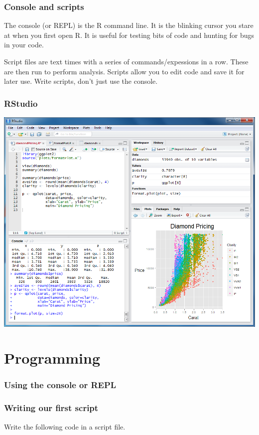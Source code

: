 \documentclass{beamer}\usepackage{graphicx, color}
\begin{document}
\begin{frame}
  \frametitle{Console and scripts}
  The console (or REPL) is the R command line. It is the blinking cursor you stare at when you first open R. It is useful for testing bits of code and hunting for bugs in your code.

  Script files are text times with a series of commands/expessions in a row. These are then run to perform analysis. Scripts allow you to edit code and save it for later use. Write scripts, don't just use the console.

\end{frame}

\begin{frame}
  \frametitle{RStudio}
  \includegraphics[height = 0.8\textheight, keepaspectratio = true]{figure/rstudio}

\end{frame}

\section{Programming}
\begin{frame}
  \frametitle{Using the console or REPL}

\end{frame}

\begin{frame}[fragile]
  \frametitle{Writing our first script}
  Write the following code in a script file.




\end{frame}
\end{document}
